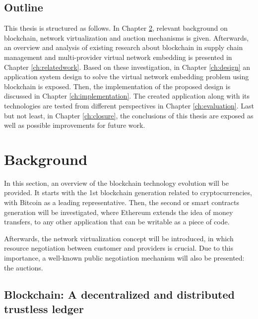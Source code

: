 \section{Outline}

This thesis is structured as follows. In Chapter \ref{ch:background}, relevant background on blockchain, network virtualization and auction mechanisms is given. Afterwards, an overview and analysis of existing research about blockchain in supply chain management and multi-provider virtual network embedding is presented in Chapter \ref{ch:relatedwork}. Based on these investigation, in Chapter \ref{ch:design} an application system design to solve the virtual network embedding problem using blockchain is exposed. Then, the implementation of the proposed design is discussed in Chapter \ref{ch:implementation}. The created application along with its technologies are tested from different perspectives in Chapter \ref{ch:evaluation}. Last but not least, in Chapter \ref{ch:closure}, the conclusions of this thesis are exposed as well as possible improvements for future work.


\chapter{Background}
\label{ch:background}

In this section, an overview of the blockchain technology evolution will be provided. It starts with the 1st blockchain generation related to cryptocurrencies, with Bitcoin as a leading representative. Then, the second or smart contracts generation will be investigated, where Ethereum extends the idea of money transfers, to any other application that can be writable as a piece of code.

Afterwards, the network virtualization concept will be introduced, in which resource negotiation between customer and providers is crucial. Due to this importance, a well-known public negotiation mechanism will also be presented: the auctions.

\section{Blockchain: A decentralized and distributed trustless ledger}


